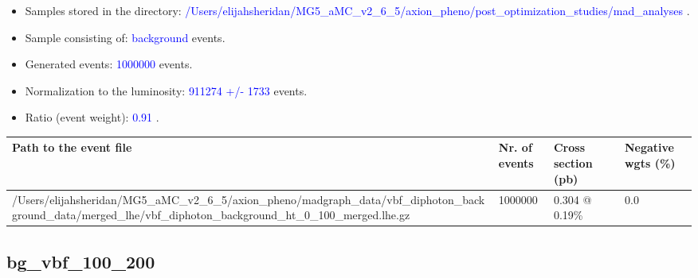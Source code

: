 \documentclass[a4paper, 10pt]{article}
\begin{document}
\begin{itemize}
  \item Samples stored in the directory: \textcolor{blue}{/\-Users/\-elijahsheridan/\-MG5\_aMC\_v2\_6\_5/\-axion\_pheno/\-post\_optimization\_studies/\-mad\_analyses} .
   \item Sample consisting of: \textcolor{blue}{background}  events.
   \item Generated events: \textcolor{blue}{1000000 }  events.
   \item Normalization to the luminosity: \textcolor{blue}{911274}\textcolor{blue}{ +/\-- }\textcolor{blue}{1733 }  events.
   \item Ratio (event weight): \textcolor{blue}{0.91 } .  
 
\end{itemize}
\begin{table}[H]
  \begin{center}
    \begin{tabular}{|m{55.0mm}|m{25.0mm}|m{30.0mm}|m{30.0mm}|}
      \hline
      {\cellcolor{yellow}         Path to the event file}& {\cellcolor{yellow}         Nr. of events}& {\cellcolor{yellow}         Cross section (pb)}& {\cellcolor{yellow}         Negative wgts (\%)}\\
      \hline
      {\cellcolor{white}          /\-Users/\-elijahsheridan/\-MG5\_aMC\_v2\_6\_5/\-axion\_pheno/\-madgraph\_data/\-vbf\_diphoton\_background\_data/\-merged\_lhe/\-vbf\_diphoton\_background\_ht\_0\_100\_merged.lhe.gz}& {\cellcolor{white}          1000000}& {\cellcolor{white}          0.304 @ 0.19\%}& {\cellcolor{white}          0.0}\\
\hline
    \end{tabular}
  \end{center}
\end{table}

\subsection{ bg\_vbf\_100\_200}
\end{document}

